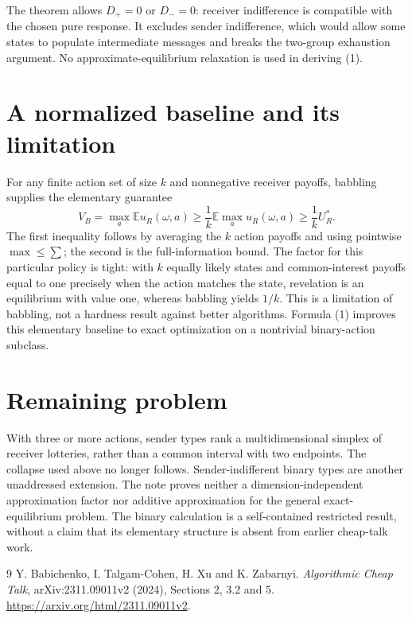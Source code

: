 \documentclass[11pt]{article}
\theoremstyle{definition}
\begin{document}
The theorem allows $D_+=0$ or $D_-=0$: receiver indifference is compatible
with the chosen pure response. It excludes sender indifference, which
would allow some states to populate intermediate messages and breaks the
two-group exhaustion argument. No approximate-equilibrium relaxation is
used in deriving (1).

\section*{A normalized baseline and its limitation}
For any finite action set of size $k$ and nonnegative receiver payoffs,
babbling supplies the elementary guarantee
\[
 V_B=\max_a\mathbb E u_R(\omega,a)
 \ge\frac1k\mathbb E\max_a u_R(\omega,a)
 \ge\frac1k U_R^*.                                      \tag{3}
\]
The first inequality follows by averaging the $k$ action payoffs and
using pointwise $\max\le\sum$; the second is the full-information bound.
The factor for this particular policy is tight: with $k$ equally likely
states and common-interest payoffs equal to one precisely when the action
matches the state, revelation is an equilibrium with value one, whereas
babbling yields $1/k$. This is a limitation of babbling, not a hardness
result against better algorithms. Formula (1) improves this elementary
baseline to exact optimization on a nontrivial binary-action subclass.

\section*{Remaining problem}
With three or more actions, sender types rank a multidimensional simplex
of receiver lotteries, rather than a common interval with two endpoints.
The collapse used above no longer follows. Sender-indifferent binary
types are another unaddressed extension. The note proves neither a
dimension-independent approximation factor nor additive approximation
for the general exact-equilibrium problem. The binary calculation is a
self-contained restricted result, without a claim that its elementary
structure is absent from earlier cheap-talk work.

\begin{thebibliography}{9}
 Y. Babichenko, I. Talgam-Cohen, H. Xu and K. Zabarnyi.
\emph{Algorithmic Cheap Talk}, arXiv:2311.09011v2 (2024),
Sections 2, 3.2 and 5.
\url{https://arxiv.org/html/2311.09011v2}.
\end{thebibliography}
\end{document}
